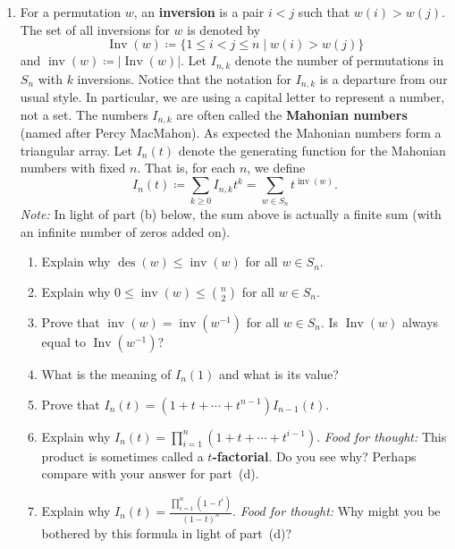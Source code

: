 \documentclass[11pt]{article}%
\theoremstyle{definition}
\DeclareMathOperator{\des}{des}
\DeclareMathOperator{\Inv}{Inv}
\DeclareMathOperator{\inv}{inv}
\begin{document}
\begin{enumerate}
\item For a permutation $w$, an \textbf{inversion} is a pair $i<j$ such that $w(i)>w(j)$.  The set of all inversions for $w$ is denoted by
\[
\Inv(w)\coloneqq \{1\leq i<j\leq n\mid w(i)>w(j)\}
\] 
and $\inv(w)\coloneqq |\Inv(w)|$. Let $I_{n,k}$ denote the number of permutations in $S_n$ with $k$ inversions.  Notice that the notation for $I_{n,k}$ is a departure from our usual style.  In particular, we are using a capital letter to represent a number, not a set. The numbers $I_{n,k}$ are often called the \textbf{Mahonian numbers} (named after Percy MacMahon). As expected the Mahonian numbers form a triangular array. Let $I_n(t)$ denote the generating function for the Mahonian numbers with fixed $n$. That is, for each $n$, we define
\[
I_n(t)\coloneqq \sum_{k\geq 0}I_{n,k}t^k=\sum_{w\in S_n} t^{\inv(w)}.
\]
\emph{Note:} In light of part (b) below, the sum above is actually a finite sum (with an infinite number of zeros added on).
\begin{enumerate}
\item Explain why $\des(w)\leq \inv(w)$ for all $w\in S_n$.
\item Explain why $0\leq \inv(w)\leq \binom{n}{2}$ for all $w\in S_n$.
\item Prove that $\inv(w)=\inv(w^{-1})$ for all $w\in S_n$. Is $\Inv(w)$ always equal to $\Inv(w^{-1})$?
\item What is the meaning of $I_n(1)$ and what is its value?
\item Prove that $I_n(t)=(1+t+\cdots +t^{n-1})I_{n-1}(t)$.
\item Explain why $I_n(t)=\prod_{i=1}^n (1+t+\cdots +t^{i-1})$. \emph{Food for thought:} This product is sometimes called a \textbf{$t$-factorial}. Do you see why? Perhaps compare with your answer for part~(d).
\item Explain why $\displaystyle I_n(t)=\frac{\prod_{i=1}^n(1-t^i)}{(1-t)^n}$. \emph{Food for thought:} Why might you be bothered by this formula in light of part~(d)?
\end{enumerate}

\end{enumerate}
\end{document}
